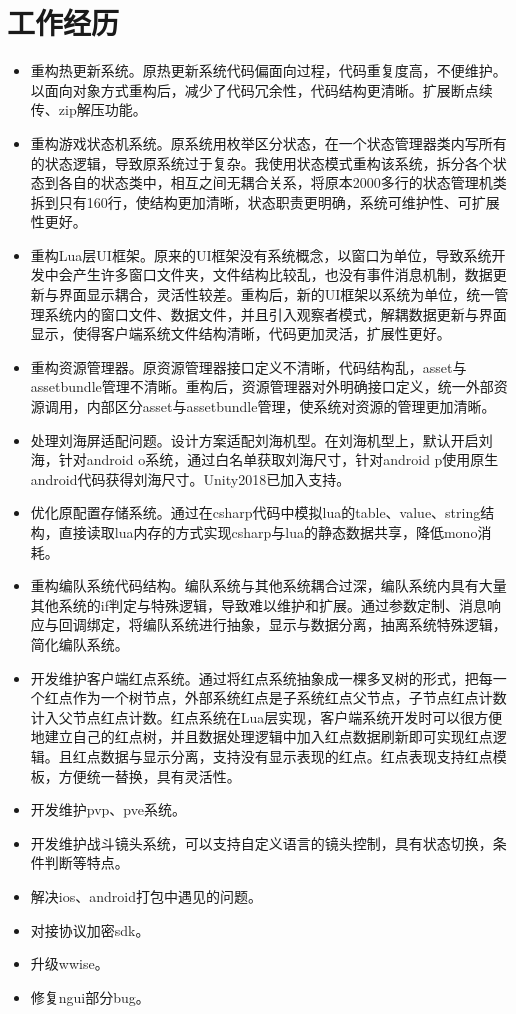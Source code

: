 \documentclass{resume}
\begin{document}
\section{工作经历}
\begin{itemize}
  \item 重构热更新系统。原热更新系统代码偏面向过程，代码重复度高，不便维护。以面向对象方式重构后，减少了代码冗余性，代码结构更清晰。扩展断点续传、zip解压功能。
  \item 重构游戏状态机系统。原系统用枚举区分状态，在一个状态管理器类内写所有的状态逻辑，导致原系统过于复杂。我使用状态模式重构该系统，拆分各个状态到各自的状态类中，相互之间无耦合关系，将原本2000多行的状态管理机类拆到只有160行，使结构更加清晰，状态职责更明确，系统可维护性、可扩展性更好。
  \item 重构Lua层UI框架。原来的UI框架没有系统概念，以窗口为单位，导致系统开发中会产生许多窗口文件夹，文件结构比较乱，也没有事件消息机制，数据更新与界面显示耦合，灵活性较差。重构后，新的UI框架以系统为单位，统一管理系统内的窗口文件、数据文件，并且引入观察者模式，解耦数据更新与界面显示，使得客户端系统文件结构清晰，代码更加灵活，扩展性更好。
  \item 重构资源管理器。原资源管理器接口定义不清晰，代码结构乱，asset与assetbundle管理不清晰。重构后，资源管理器对外明确接口定义，统一外部资源调用，内部区分asset与assetbundle管理，使系统对资源的管理更加清晰。
  \item 处理刘海屏适配问题。设计方案适配刘海机型。在刘海机型上，默认开启刘海，针对android o系统，通过白名单获取刘海尺寸，针对android p使用原生android代码获得刘海尺寸。Unity2018已加入支持。
  \item 优化原配置存储系统。通过在csharp代码中模拟lua的table、value、string结构，直接读取lua内存的方式实现csharp与lua的静态数据共享，降低mono消耗。
  \item 重构编队系统代码结构。编队系统与其他系统耦合过深，编队系统内具有大量其他系统的if判定与特殊逻辑，导致难以维护和扩展。通过参数定制、消息响应与回调绑定，将编队系统进行抽象，显示与数据分离，抽离系统特殊逻辑，简化编队系统。
  \item 开发维护客户端红点系统。通过将红点系统抽象成一棵多叉树的形式，把每一个红点作为一个树节点，外部系统红点是子系统红点父节点，子节点红点计数计入父节点红点计数。红点系统在Lua层实现，客户端系统开发时可以很方便地建立自己的红点树，并且数据处理逻辑中加入红点数据刷新即可实现红点逻辑。且红点数据与显示分离，支持没有显示表现的红点。红点表现支持红点模板，方便统一替换，具有灵活性。
  \item 开发维护pvp、pve系统。
  \item 开发维护战斗镜头系统，可以支持自定义语言的镜头控制，具有状态切换，条件判断等特点。
  \item 解决ios、android打包中遇见的问题。
  \item 对接协议加密sdk。
  \item 升级wwise。
  \item 修复ngui部分bug。
\end{itemize}
\end{document}
